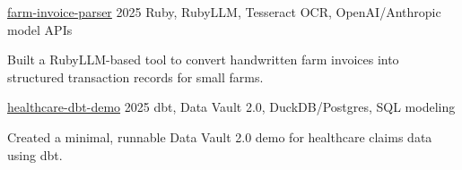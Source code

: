 


\begin{cventries}
\cvshortentry
  {\href{https://github.com/bubnicbf/farm-invoice-parser}{farm-invoice-parser}}
  {2025}
  {Ruby, RubyLLM, Tesseract OCR, OpenAI/Anthropic model APIs}
    \begin{flushleft} %
      Built a RubyLLM-based tool to convert handwritten farm invoices into structured transaction records for small farms.
    \end{flushleft}


\cvshortentry
  {\href{https://github.com/bubnicbf/healthcare-dbt-demo}{healthcare-dbt-demo}}
  {2025}
  {dbt, Data Vault 2.0, DuckDB/Postgres, SQL modeling}
    \begin{flushleft} %
      Created a minimal, runnable Data Vault 2.0 demo for healthcare claims data using dbt.
    \end{flushleft}


\end{cventries}
